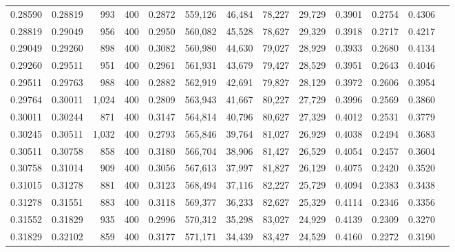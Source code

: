 \begin{tabular}{rrrrrrrrrrrrr}
0.28590 & 0.28819 &    993 & 400 &                                     0.2872 & 559,126 &  46,484 &  78,227 &  29,729 & 0.3901 & 0.2754 & 0.4306 \\
0.28819 & 0.29049 &    956 & 400 &                                     0.2950 & 560,082 &  45,528 &  78,627 &  29,329 & 0.3918 & 0.2717 & 0.4217 \\
0.29049 & 0.29260 &    898 & 400 &                                     0.3082 & 560,980 &  44,630 &  79,027 &  28,929 & 0.3933 & 0.2680 & 0.4134 \\
0.29260 & 0.29511 &    951 & 400 &                                     0.2961 & 561,931 &  43,679 &  79,427 &  28,529 & 0.3951 & 0.2643 & 0.4046 \\
0.29511 & 0.29763 &    988 & 400 &                                     0.2882 & 562,919 &  42,691 &  79,827 &  28,129 & 0.3972 & 0.2606 & 0.3954 \\
0.29764 & 0.30011 &  1,024 & 400 &                                     0.2809 & 563,943 &  41,667 &  80,227 &  27,729 & 0.3996 & 0.2569 & 0.3860 \\
0.30011 & 0.30244 &    871 & 400 &                                     0.3147 & 564,814 &  40,796 &  80,627 &  27,329 & 0.4012 & 0.2531 & 0.3779 \\
0.30245 & 0.30511 &  1,032 & 400 &                                     0.2793 & 565,846 &  39,764 &  81,027 &  26,929 & 0.4038 & 0.2494 & 0.3683 \\
0.30511 & 0.30758 &    858 & 400 &                                     0.3180 & 566,704 &  38,906 &  81,427 &  26,529 & 0.4054 & 0.2457 & 0.3604 \\
0.30758 & 0.31014 &    909 & 400 &                                     0.3056 & 567,613 &  37,997 &  81,827 &  26,129 & 0.4075 & 0.2420 & 0.3520 \\
0.31015 & 0.31278 &    881 & 400 &                                     0.3123 & 568,494 &  37,116 &  82,227 &  25,729 & 0.4094 & 0.2383 & 0.3438 \\
0.31278 & 0.31551 &    883 & 400 &                                     0.3118 & 569,377 &  36,233 &  82,627 &  25,329 & 0.4114 & 0.2346 & 0.3356 \\
0.31552 & 0.31829 &    935 & 400 &                                     0.2996 & 570,312 &  35,298 &  83,027 &  24,929 & 0.4139 & 0.2309 & 0.3270 \\
0.31829 & 0.32102 &    859 & 400 &                                     0.3177 & 571,171 &  34,439 &  83,427 &  24,529 & 0.4160 & 0.2272 & 0.3190 \\

\end{tabular}
